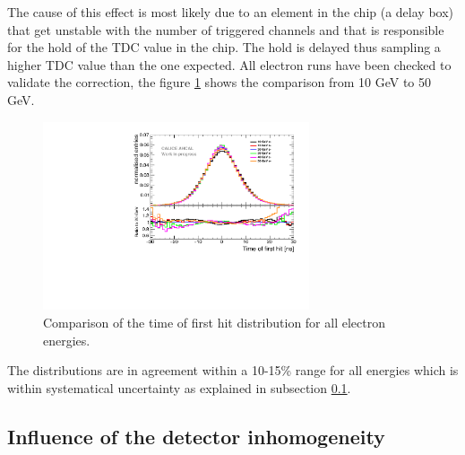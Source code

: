 \documentclass[twoside,a4paper,11pt]{article}
\begin{document}
The cause of this effect is most likely due to an element in the chip (a delay box) that get unstable with the number of triggered channels and that is responsible for the hold of the TDC value in the chip. The hold is delayed thus sampling a higher TDC value than the one expected. All electron runs have been checked to validate the correction, the figure \ref{fig:all_electron_energies} shows the comparison from 10 GeV to 50 GeV.
\begin{figure}[htbp]
\begin{center}
\includegraphics[width=0.7\textwidth]{fig/Electrons/ComparisonDataEnergies.pdf}
\caption{Comparison of the time of first hit distribution for all electron energies.}
\label{fig:all_electron_energies}
\end{center}
\end{figure}
The distributions are in agreement within a 10-15\% range for all energies which is within systematical uncertainty as explained in subsection \ref{subsec:det_inhomo}.

\subsection{Influence of the detector inhomogeneity}
\label{subsec:det_inhomo}
\end{document}
